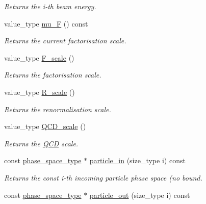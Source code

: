 \begin{DoxyCompactItemize}
\begin{DoxyCompactList}\small\item\em Returns the i-\/th beam energy. \end{DoxyCompactList}\item 
\hypertarget{a00212_a5f54990b04f9222933b32b8cd13ac4d8}{}value\+\_\+type \hyperlink{a00212_a5f54990b04f9222933b32b8cd13ac4d8}{mu\+\_\+\+F} () const \label{a00212_a5f54990b04f9222933b32b8cd13ac4d8}

\begin{DoxyCompactList}\small\item\em Returns the current factorisation scale. \end{DoxyCompactList}\item 
\hypertarget{a00212_abe64f2b5afc4b8a008a586fbb438d9c7}{}value\+\_\+type \hyperlink{a00212_abe64f2b5afc4b8a008a586fbb438d9c7}{F\+\_\+scale} ()\label{a00212_abe64f2b5afc4b8a008a586fbb438d9c7}

\begin{DoxyCompactList}\small\item\em Returns the factorisation scale. \end{DoxyCompactList}\item 
\hypertarget{a00212_a8da9cf12c0989e5cdab88598b22e25bd}{}value\+\_\+type \hyperlink{a00212_a8da9cf12c0989e5cdab88598b22e25bd}{R\+\_\+scale} ()\label{a00212_a8da9cf12c0989e5cdab88598b22e25bd}

\begin{DoxyCompactList}\small\item\em Returns the renormalisation scale. \end{DoxyCompactList}\item 
\hypertarget{a00212_a6ad3a46d7ebd0b31999c367c406bdb74}{}value\+\_\+type \hyperlink{a00212_a6ad3a46d7ebd0b31999c367c406bdb74}{Q\+C\+D\+\_\+scale} ()\label{a00212_a6ad3a46d7ebd0b31999c367c406bdb74}

\begin{DoxyCompactList}\small\item\em Returns the \hyperlink{a00460}{Q\+C\+D} scale. \end{DoxyCompactList}\item 
\hypertarget{a00212_a2a6c913c456f562a3e464cd89553993f}{}const \hyperlink{a00406}{phase\+\_\+space\+\_\+type} $\ast$ \hyperlink{a00212_a2a6c913c456f562a3e464cd89553993f}{particle\+\_\+in} (size\+\_\+type i) const \label{a00212_a2a6c913c456f562a3e464cd89553993f}

\begin{DoxyCompactList}\small\item\em Returns the const i-\/th incoming particle phase space (no bound. \end{DoxyCompactList}\item 
\hypertarget{a00212_af775cf485839e207d09aa4fcfefac37b}{}const \hyperlink{a00406}{phase\+\_\+space\+\_\+type} $\ast$ \hyperlink{a00212_af775cf485839e207d09aa4fcfefac37b}{particle\+\_\+out} (size\+\_\+type i) const \label{a00212_af775cf485839e207d09aa4fcfefac37b}


\end{DoxyCompactItemize}
